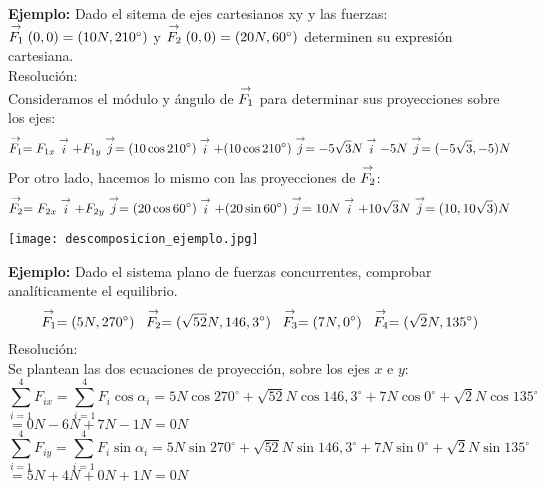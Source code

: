 \textbf{Ejemplo:} Dado el sitema de ejes cartesianos xy y las fuerzas: $\stackrel{\to}{F_1}(0,0) = (10N, 210^\circ)$ y $\stackrel{\to}{F_2}(0,0) = (20N, 60^\circ)$ determinen su expresión cartesiana.\\
Resolución:\\
Consideramos el módulo y ángulo de $\stackrel{\to}{F_1}$ para determinar sus proyecciones sobre los ejes:
$$\stackrel{\to}{F_1} = F_{1x}\stackrel{\to}{i} + F_{1y}\stackrel{\to}{j} = (10 \cos 210^\circ)\stackrel{\to}{i} + (10 \cos 210^\circ)\stackrel{\to}{j} = -5\sqrt{3}N\stackrel{\to}{i} - 5N\stackrel{\to}{j} = (-5\sqrt{3},-5)N$$
Por otro lado, hacemos lo mismo con las proyecciones de $\stackrel{\to}{F_2}$:
$$\stackrel{\to}{F_2} = F_{2x}\stackrel{\to}{i} + F_{2y}\stackrel{\to}{j} = (20 \cos 60^\circ)\stackrel{\to}{i} + (20 \sin 60^\circ)\stackrel{\to}{j} = 10N\stackrel{\to}{i} + 10\sqrt{3}N\stackrel{\to}{j} = (10,10\sqrt{3})N$$

\begin{center}
    \texttt{[image: descomposicion\_ejemplo.jpg]}
\end{center}


\textbf{Ejemplo:} Dado el sistema plano de fuerzas concurrentes, comprobar analíticamente el equilibrio.
$$\stackrel{\to}{F_1} = (5N, 270^\circ) \;\; \stackrel{\to}{F_2} = (\sqrt{52}N, 146,3^\circ) \;\; \stackrel{\to}{F_3} = (7N, 0^\circ) \;\; \stackrel{\to}{F_4} = (\sqrt{2}N, 135^\circ)$$
Resolución:\\
Se plantean las dos ecuaciones de proyección, sobre los ejes $x$ e $y$:
$$\sum^4_{i=1}F_{ix} = \sum^4_{i=1}F_{i} \cos \alpha_i = 5N \cos 270^\circ + \sqrt{52}N \cos 146,3^\circ + 7N \cos 0^\circ + \sqrt{2}N \cos 135^\circ$$
$= 0N-6N+7N-1N = 0N$
$$\sum^4_{i=1}F_{iy} = \sum^4_{i=1}F_{i} \sin \alpha_i = 5N \sin 270^\circ + \sqrt{52}N \sin 146,3^\circ + 7N \sin 0^\circ + \sqrt{2}N \sin 135^\circ$$
$= 5N+4N+0N+1N = 0N$

